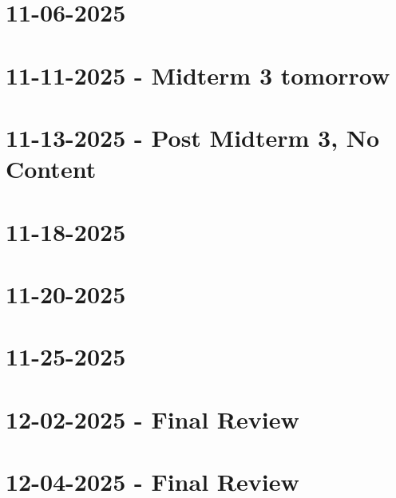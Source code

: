 \documentclass[]{mangos-musings}
\begin{document}
\newpage
\section{11-06-2025}

\newpage
\section{11-11-2025 - Midterm 3 tomorrow}

\newpage
\section{11-13-2025 - Post Midterm 3, No Content}

\newpage
\section{11-18-2025}

\newpage
\section{11-20-2025}

\newpage
\section{11-25-2025}

\newpage
\section{12-02-2025 - Final Review}

\newpage
\section{12-04-2025 - Final Review}
\end{document}
